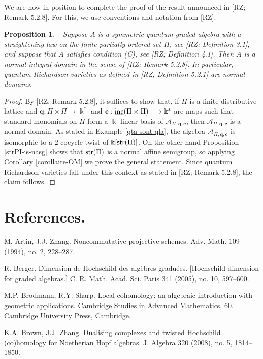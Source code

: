 \documentclass[twoside,11pt]{article}
\renewcommand{\k}{\Bbbk}
\newcommand{\A}{{\mathcal A}}
\renewcommand{\c}{{\mathbf c}}
\newcommand{\q}{{\mathbf q}}
\newcommand{\StMon}{{\sf str}}
\newcommand{\inc}{\underline{{\rm inc}}}
\newtheorem{subproposition}[subtheorem]{Proposition}
\begin{document}
We are now in position to complete the proof of the result announced in [RZ; Remark 5.2.8]. 
For this, we use conventions and notation from [RZ].

\begin{subproposition} -- 
Suppose $A$ is a symmetric quantum graded algebra with a straightening law on the finite
partially ordered set $\Pi$, see [RZ; Definition 3.1], and suppose that $A$ satisfies
condition (C), see [RZ; Definition 4.1]. Then $A$ is a normal integral domain in the sense
of [RZ; Remark 5.2.8]. In particular, quantum Richardson varieties as defined in [RZ;
Definition 5.2.1] are normal domains.
\end{subproposition}

\begin{proof} By [RZ; Remark 5.2.8], it suffices to show that, if $\Pi$ is a finite
	distributive
lattice and $\q : \Pi \times \Pi \longrightarrow \k^*$ and $\c : \inc(\Pi \times \Pi)
\longrightarrow \k^*$ are maps such that standard monomials on $\Pi$ form a $\k$-linear
basis of $\A_{\Pi,\q,\c}$, then $\A_{\Pi,\q,\c}$ is a normal domain. As stated in Example
\ref{qta-sont-qla}, the algebra $\A_{\Pi,\q,\c}$ is isomorphic to a $2$-cocycle twist of
$\k[\StMon(\Pi)]$. On the other hand Proposition \ref{strPI-is-nasg} shows that
$\StMon(\Pi)$ is a normal affine semigroup, so applying Corollary \ref{corollaire-OM} we
prove the general statement. Since quantum Richardson varieties fall under this context as
stated in [RZ; Remark 5.2.8], the claim follows. \end{proof}






\section*{References.}
\noindent 
[AZ] 
M. Artin, J.J. Zhang. 
Noncommutative projective schemes. 
Adv. Math. 109 (1994), no. 2, 228--287.

\noindent
[Ber]
R. Berger. 
Dimension de Hochschild des alg\`ebres gradu\'ees.  
[Hochschild dimension for graded algebras.] 
C. R. Math. Acad. Sci. Paris 341 (2005), no. 10, 597--600.

\noindent
[BS]
M.P. Brodmann, R.Y. Sharp. 
Local cohomology: an algebraic introduction with geometric applications. 
Cambridge Studies in Advanced Mathematics, 60. Cambridge University Press, Cambridge.

\noindent
[BZ]
K.A. Brown, J.J. Zhang. 
Dualising complexes and twisted Hochschild (co)homology for Noetherian Hopf algebras.
J. Algebra 320 (2008), no. 5, 1814--1850.
\end{document}

